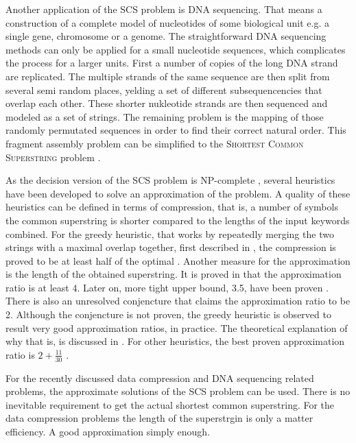 \documentclass[english,twoside,censored,csm,algorithms-track-2020]{HYthesisML}
\theoremstyle{plain}
\theoremstyle{definition}
\begin{document}
Another application of the SCS problem is DNA sequencing. That means a construction of a complete
model of nucleotides of some biological unit e.g. a single gene, chromosome or a genome. 
The straightforward DNA sequencing methods can only be applied for a small nucleotide sequences,
which complicates the process for a larger units. First a number of copies of the long DNA strand are
replicated. The multiple strands of the same sequence are then split from several semi random
places, yelding a set of different subsequencencies that overlap each other. These shorter nukleotide
strands are then sequenced and modeled as a set of strings. The remaining problem is the mapping of
those randomly permutated sequences in order to find their correct natural order.
This fragment assembly problem can be simplified to the \textsc{Shortest Common Superstring}
problem \citep{Peltola83}.

As the decision version of the SCS problem is \textsc{NP}-complete \citep{Gallant80},
several heuristics have been
developed to solve an approximation of the problem.
A quality of these heuristics
can be defined in terms of compression, that is, a number of symbols the common superstring
is shorter compared to the lengths of the input keywords combined. For the greedy heuristic,
that works by repeatedly merging the two strings with a maximal overlap together, first
described in \cite{Gallant82}, the compression is proved to be at least half of the optimal
\citep{Tarhio88}. Another measure for the approximation is the length of the
obtained superstring. It is proved in \cite{Blum94} that the approximation ratio is at least 4.
Later on, more tight upper bound, 3.5, have been proven \citep{Kaplan05}. There is also an
unresolved conjencture \cite{Tarhio88} that claims the approximation ratio to be 2. Although
the conjencture is not proven, the greedy heuristic is observed to result very good approximation
ratios, in practice. The theoretical explanation of why that is, is discussed in \citep{Ma08}.
For other heuristics,
the best proven approximation ratio is $2 + \frac{11}{30}$ \citep{Paluch14}.

For the recently discussed data compression and DNA sequencing related problems,
the approximate solutions of the SCS problem can be used. There is no inevitable requirement
to get the actual shortest common superstring. For the data compression problems the length of
the superstrgin is only a matter efficiency. A good approximation simply enough. 
\end{document}
